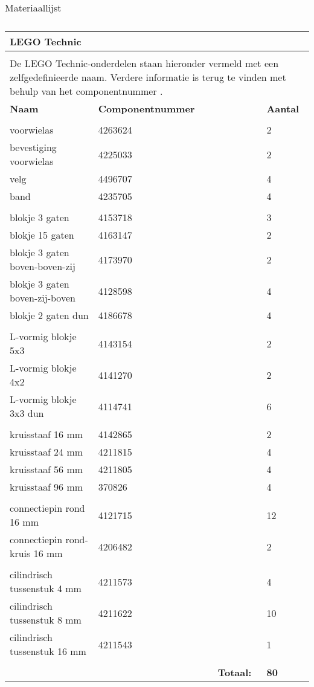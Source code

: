 \begin{center}
\begin{table}
\begin{tabular}{| p{3cm} | l | p{3cm} | p{2cm} | p{2cm}|}
\end{tabular}
\caption[Materiaallijst]{Materiaallijst}
\label{table:materiaallijst}
\end{table}
\begin{table}
 \begin{tabular}{|l|l|l|l|}
 \hline
\textbf{LEGO Technic} &  &  & \\\hline
 &  &  & \\\hline
\multicolumn{4}{|p{10cm}|}{De LEGO Technic-onderdelen staan hieronder vermeld 
met een zelfgedefinieerde naam. Verdere informatie is terug te vinden met behulp 
van het componentnummer \cite{LegoSite}.} \\\hline
\textbf{Naam} & \textbf{Componentnummer} &  & \textbf{Aantal} \\\hline
 &  &  & \\\hline
voorwielas & 4263624 &  & 2\\\hline
bevestiging voorwielas & 4225033 &  & 2\\\hline
velg & 4496707 &  & 4\\\hline
band & 4235705 &  & 4\\\hline
 &  &  & \\\hline
blokje 3 gaten & 4153718 &  & 3\\\hline
blokje 15 gaten & 4163147 &  & 2\\\hline
blokje  3 gaten boven-boven-zij & 4173970 &  & 2\\\hline
blokje 3 gaten boven-zij-boven & 4128598 &  & 4\\\hline
blokje 2 gaten dun & 4186678 &  & 4\\\hline
 &  &  & \\\hline
L-vormig blokje 5x3 & 4143154 &  & 2\\\hline
L-vormig blokje 4x2 & 4141270 &  & 2\\\hline
L-vormig blokje 3x3 dun & 4114741 &  & 6\\\hline
 &  &  & \\\hline
kruisstaaf 16 mm & 4142865 &  & 2\\\hline
kruisstaaf 24 mm & 4211815 &  & 4\\\hline
kruisstaaf 56 mm & 4211805 &  & 4\\\hline
kruisstaaf 96 mm & 370826 &  & 4\\\hline
 &  &  & \\\hline
connectiepin rond 16 mm & 4121715 &  & 12\\\hline
connectiepin rond-kruis 16 mm & 4206482 &  & 2\\\hline
 &  &  & \\\hline
cilindrisch tussenstuk 4 mm & 4211573 &  & 4\\\hline
cilindrisch tussenstuk 8 mm & 4211622 &  & 10\\\hline
cilindrisch tussenstuk 16 mm & 4211543 &  & 1\\\hline
 &  &  & \\\hline
 &  & \textbf{Totaal: }& \textbf{80}\\\hline


\end{tabular}
\end{table}
\end{center}
